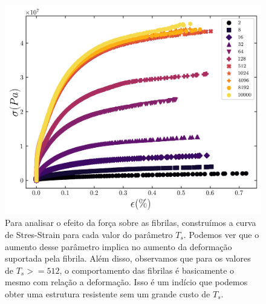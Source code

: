 \documentclass{article}
\begin{document}
\begin{figure}[H]
    \centering
    \includegraphics[width=\textwidth]{figures/stress_strain.png}

    \caption{Para analisar o efeito da força sobre as fibrilas, construímos a curva de Stres-Strain para cada valor do parâmetro $T_{s}$. Podemos ver que o aumento desse parâmetro implica no aumento da deformação suportada pela fibrila. Além disso, observamos que para os valores de $T_{s}>=512$, o comportamento das fibrilas é basicamente o mesmo com relação a deformação. Isso é um indício que podemos obter uma estrutura resistente sem um grande custo de $T_{s}$.}

    \label{}
\end{figure}
\end{document}
